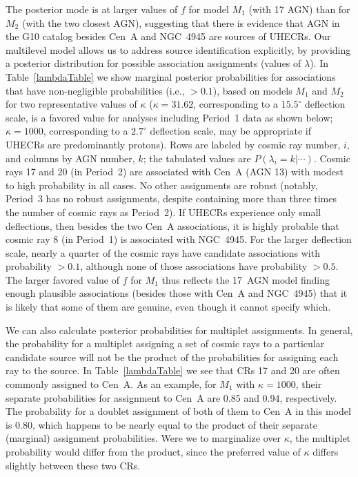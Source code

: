 The posterior mode is at larger values of $f$ for model $M_1$ (with 17 AGN)
than for $M_2$ (with the two closest AGN), suggesting that there is evidence
that AGN in the G10 catalog besides Cen~A and NGC~4945 are sources of
UHECRs.  Our multilevel model allows us to address source identification
explicitly, by providing a posterior distribution for possible association
assignments (values of $\lambda$).  In Table~\ref{lambdaTable} we show
marginal posterior probabilities for associations that have non-negligible
probabilities (i.e., $>0.1$), based on models $M_1$ and $M_2$ for two
representative values of $\kappa$ ($\kappa = 31.62$, corresponding to a
$15.5^\circ$ deflection scale, is a favored value for analyses including
Period~1 data as shown below; $\kappa=1000$, corresponding to a $2.7^\circ$
deflection scale, may be appropriate if UHECRs are predominantly protons). 
Rows are labeled by cosmic ray number, $i$, and columns by AGN number, $k$;
the tabulated values are $P(\lambda_i=k|\cdots)$.  Cosmic rays 17 and 20 (in
Period~2) are associated with Cen~A (AGN 13) with modest to high probability
in all cases.  No other assignments are robust (notably, Period~3 has no
robust assignments, despite containing more than three times the number of
cosmic rays as Period~2).  If UHECRs experience only small deflections, then
besides the two Cen~A associations, it is highly probable that cosmic ray 8
(in Period~1) is associated with NGC~4945.  For the larger deflection scale,
nearly a quarter of the cosmic rays have candidate associations with
probability $>0.1$, although none of those associations have probability
$>0.5$.
The larger favored value of $f$ for $M_1$ thus reflects the 17~AGN
model finding enough plausible associations (besides those with Cen~A and
NGC~4945) that it is likely that some of them are genuine, even though
it cannot specify which.

We can also calculate posterior probabilities for multiplet assignments.  In
general, the probability for a multiplet assigning a set of cosmic rays to a
particular candidate source will not be the product of the probabilities for
assigning each ray to the source.  In Table~\ref{lambdaTable} we see that
CRs 17 and 20 are often commonly assigned to Cen~A.  As an example, for
$M_1$ with $\kappa=1000$, their separate probabilities for assignment to
Cen~A are 0.85 and 0.94, respectively.  The probability for a doublet
assignment of both of them to Cen~A in this model is 0.80, which happens to
be nearly equal to the product of their separate (marginal) assignment
probabilities.  Were we to marginalize over $\kappa$, the multiplet
probability would differ from the product, since the preferred value
of $\kappa$ differs slightly between these two CRs.

